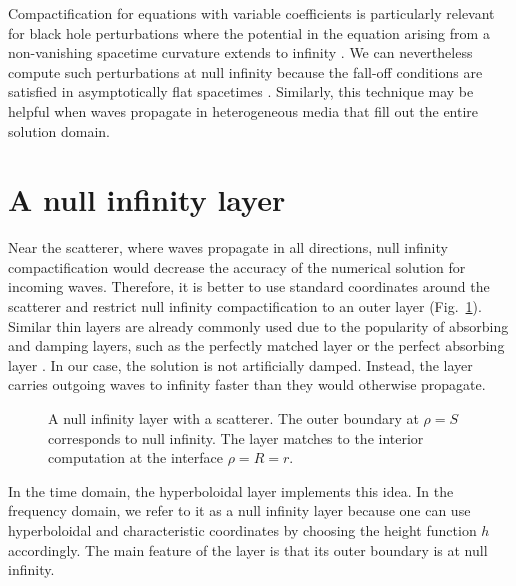\documentclass[draft,onefignum,onetabnum]{siamart190516}
\begin{document}
Compactification for equations with variable coefficients is particularly relevant for black hole perturbations where the potential in the equation arising from a non-vanishing spacetime curvature extends to infinity \cite{regge1957stability}. We can nevertheless compute such perturbations at null infinity because the fall-off conditions are satisfied in asymptotically flat spacetimes \cite{ZengFramework, jaramillo2021pseudospectrum}. Similarly, this technique may be helpful when waves propagate in heterogeneous media that fill out the entire solution domain.

\section{A null infinity layer}\label{sec:nil}
Near the scatterer, where waves propagate in all directions, null infinity compactification would decrease the accuracy of the numerical solution for incoming waves. Therefore, it is better to use standard coordinates around the scatterer and restrict null infinity compactification to an outer layer (Fig.~\ref{fig:annulus}). Similar thin layers are already commonly used due to the popularity of absorbing and damping layers, such as the perfectly matched layer \cite{BERENGER1994185} or the perfect absorbing layer \cite{wang2017perfect, yang2021truly}. In our case, the solution is not artificially damped. Instead, the layer carries outgoing waves to infinity faster than they would otherwise propagate. 

\begin{figure}[tbhp]
\centering
{}
\caption{A null infinity layer with a scatterer. The outer boundary at $\rho=S$ corresponds to null infinity. The layer matches to the interior computation at the interface $\rho=R=r$.}
\label{fig:annulus}
\end{figure}

In the time domain, the hyperboloidal layer \cite{ZENGINOGLU20112286} implements this idea. In the frequency domain, we refer to it as a null infinity layer because one can use hyperboloidal and characteristic coordinates by choosing the height function $h$ accordingly. The main feature of the layer is that its outer boundary is at null infinity. 
\end{document}
